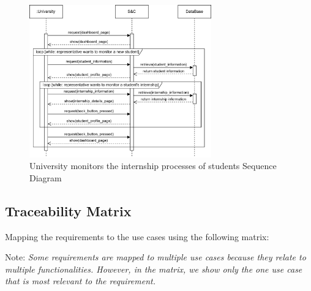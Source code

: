 \begin{figure}[H]
    \centering
    \includegraphics[width=0.70\textwidth]{Images/Sequence_Diagrams/monitor_SD.png}
    \caption{University monitors the internship processes of students Sequence Diagram}
\end{figure}


\subsection{Traceability Matrix}
Mapping the requirements to the use cases using the following matrix:

Note: \textit{Some requirements are mapped to multiple use cases because they relate to multiple functionalities.
However, in the matrix, we show only the one use case that is most relevant to the requirement.}

